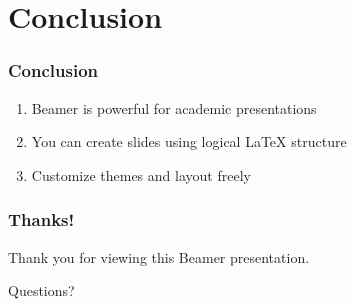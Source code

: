 \documentclass{beamer}
\begin{document}
\section{Conclusion}
\begin{frame}
  \frametitle{Conclusion}
  \begin{enumerate}
    \item Beamer is powerful for academic presentations
    \item You can create slides using logical LaTeX structure
    \item Customize themes and layout freely
  \end{enumerate}
\end{frame}

\begin{frame}
  \frametitle{Thanks!}
  Thank you for viewing this Beamer presentation.
  
  \vspace{1cm}
  Questions?
\end{frame}
\end{document}

